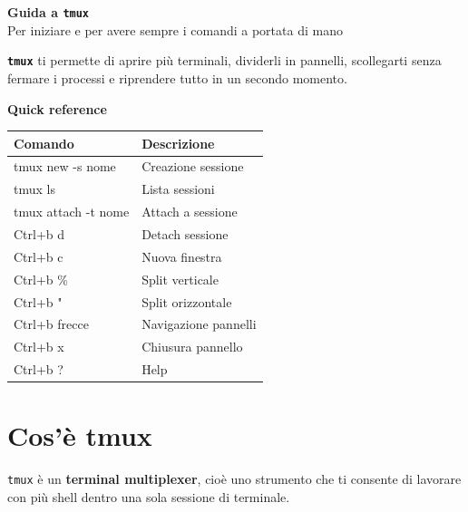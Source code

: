 \documentclass[a4paper,11pt]{article}
\begin{document}
\vspace*{1.5cm}

{\Huge\bfseries\color{MainColor} Guida  a \texttt{tmux}} \\[0.4cm]
{\Large\color{AccentColor} Per iniziare e per avere sempre i comandi a portata di mano}


\vspace{1cm}

\begin{infobox}
\textbf \texttt{tmux} ti permette di aprire più terminali, dividerli in pannelli, scollegarti senza fermare i processi e riprendere tutto in un secondo momento.
\end{infobox}

\vspace{0.5cm}

\begin{codebox}
\textbf{Quick reference}

\renewcommand{\arraystretch}{1.2}
\begin{tabularx}{\textwidth}{>{\ttfamily}l X}
\toprule
Comando & Descrizione \\
\midrule
 tmux new -s nome & Creazione sessione \\
 tmux ls & Lista sessioni \\
 tmux attach -t nome & Attach a sessione \\
 Ctrl+b d & Detach sessione \\
 Ctrl+b c & Nuova finestra \\
 Ctrl+b \% & Split verticale \\
 Ctrl+b " & Split orizzontale \\
 Ctrl+b frecce & Navigazione pannelli \\
 Ctrl+b x & Chiusura pannello \\
 Ctrl+b ? & Help \\
\bottomrule
\end{tabularx}
\end{codebox}

\vspace{0.6cm}
\tableofcontents
\newpage

\section{Cos'è tmux}
\texttt{tmux} è un \textbf{terminal multiplexer}, cioè uno strumento che ti consente di lavorare con più shell dentro una sola sessione di terminale.
\end{document}
